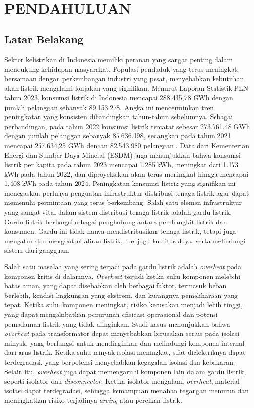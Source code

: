 \chapter{PENDAHULUAN}
\label{chap:pendahuluan}

\section{Latar Belakang}
\sloppy
Sektor kelistrikan di Indonesia memiliki peranan yang sangat penting dalam mendukung kehidupan masyarakat. Populasi penduduk yang terus meningkat, bersamaan dengan perkembangan industri yang pesat, menyebabkan kebutuhan akan listrik mengalami lonjakan yang signifikan. Menurut Laporan Statistik PLN tahun 2023, konsumsi listrik di Indonesia mencapai 288.435,78 GWh dengan jumlah pelanggan sebanyak 89.153.278. Angka ini mencerminkan tren peningkatan yang konsisten dibandingkan tahun-tahun sebelumnya. Sebagai perbandingan, pada tahun 2022 konsumsi listrik tercatat sebesar 273.761,48 GWh dengan jumlah pelanggan sebanyak 85.636.198, sedangkan pada tahun 2021 mencapai 257.634,25 GWh dengan 82.543.980 pelanggan \cite{PLN2023}. Data dari Kementerian Energi dan Sumber Daya Mineral (ESDM) juga menunjukkan bahwa konsumsi listrik per kapita pada tahun 2023 mencapai 1.285 kWh, meningkat dari 1.173 kWh pada tahun 2022, dan diproyeksikan akan terus meningkat hingga mencapai 1.408 kWh pada tahun 2024\cite{ESDM2024}. Peningkatan konsumsi listrik yang signifikan ini menegaskan perlunya penguatan infrastruktur distribusi tenaga listrik agar dapat memenuhi permintaan yang terus berkembang. Salah satu elemen infrastruktur yang sangat vital dalam sistem distribusi tenaga listrik adalah gardu listrik. Gardu listrik berfungsi sebagai penghubung antara pembangkit listrik dan konsumen. Gardu ini tidak hanya mendistribusikan tenaga listrik, tetapi juga mengatur dan mengontrol aliran listrik, menjaga kualitas daya, serta melindungi sistem dari gangguan.

Salah satu masalah yang sering terjadi pada gardu listrik adalah \emph{overheat} pada komponen kritis di dalamnya. \emph{Overheat} terjadi ketika suhu komponen melebihi batas aman, yang dapat disebabkan oleh berbagai faktor, termasuk beban berlebih, kondisi lingkungan yang ekstrem, dan kurangnya pemeliharaan yang tepat\cite{Bailey2022}. Ketika suhu komponen meningkat, risiko kerusakan menjadi lebih tinggi, yang dapat mengakibatkan penurunan efisiensi operasional dan potensi pemadaman listrik yang tidak diinginkan\cite{Aksenovich2022}. Studi kasus menunjukkan bahwa \emph{overheat} pada transformator dapat menyebabkan kerusakan serius pada isolasi minyak, yang berfungsi untuk mendinginkan dan melindungi komponen internal dari arus listrik. Ketika suhu minyak isolasi meningkat, sifat dielektriknya dapat terdegradasi, yang berpotensi menyebabkan kegagalan isolasi dan kebakaran\cite{Kalathiripi2017}. Selain itu, \emph{overheat} juga dapat memengaruhi komponen lain dalam gardu listrik, seperti isolator dan \emph{disconnector}. Ketika isolator mengalami \emph{overheat}, material isolasi dapat terdegradasi, sehingga kemampuan menahan tegangan menurun dan meningkatkan risiko terjadinya \emph{arcing} atau percikan listrik\cite{Li2017}.

